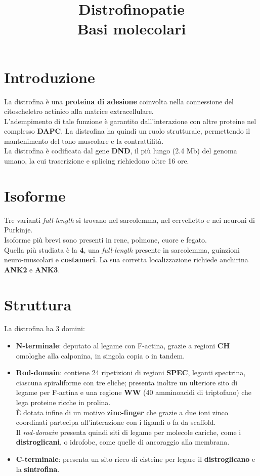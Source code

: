 \documentclass[a4paper, 12pt]{article}
\date{}
\title{%
  Distrofinopatie \\
  \large Basi molecolari
}
\begin{document}
\maketitle

\section{Introduzione}
La distrofina è una \textbf{proteina di adesione} coinvolta nella connessione del citoscheletro actinico alla matrice extracellulare.\\
L'adempimento di tale funzione è garantito dall'interazione con altre proteine nel complesso \textbf{DAPC}. La distrofina ha quindi un ruolo strutturale, permettendo il mantenimento del tono muscolare e la contrattilità.\\
La distrofina è codificata dal gene \textbf{DND}, il più lungo (2.4 Mb) del genoma umano, la cui trascrizione e splicing richiedono oltre 16 ore.

\section{Isoforme}
Tre varianti \textit{full-length} si trovano nel sarcolemma, nel cervelletto e nei neuroni di Purkinje.\\
Isoforme più brevi sono presenti in rene, polmone, cuore e fegato.\\
Quella più studiata è la \textbf{4}, una \textit{full-length} presente in sarcolemma, guinzioni neuro-muscolari e \textbf{costameri}. La sua corretta localizzazione richiede anchirina \textbf{ANK2} e \textbf{ANK3}.

\section{Struttura}
La distrofina ha 3 domini:
\begin{itemize}
\item \textbf{N-terminale}: deputato al legame con F-actina, grazie a regioni \textbf{CH} omologhe alla calponina, in singola copia o in tandem.
\item \textbf{Rod-domain}: contiene 24 ripetizioni di regioni \textbf{SPEC}, leganti spectrina, ciascuna spiraliforme con tre eliche; presenta inoltre un ulteriore sito di legame per F-actina e una regione \textbf{WW} (40 amminoacidi di triptofano) che lega proteine ricche in prolina.\\
È dotata infine di un motivo \textbf{zinc-finger} che grazie a due ioni zinco coordinati partecipa all'interazione con i ligandi o fa da scaffold.\\
Il \textit{rod-domain} presenta quindi siti di legame per molecole cariche, come i \textbf{distroglicani}, o idrofobe, come quelle di ancoraggio alla membrana.
\item \textbf{C-terminale}: presenta un sito ricco di cisteine per legare il \textbf{distroglicano} e la \textbf{sintrofina}.
\end{itemize}
\end{document}
